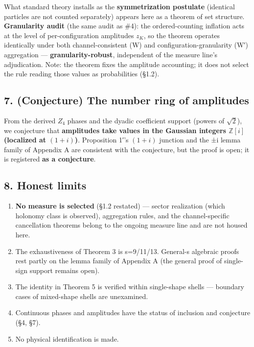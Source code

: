 \documentclass[
]{ltjsarticle}
\providecommand{\tightlist}{%
  \setlength{\itemsep}{0pt}\setlength{\parskip}{0pt}}
\begin{document}
What standard theory installs as the \textbf{symmetrization postulate}
(identical particles are not counted separately) appears here as a
theorem of set structure. \textbf{Granularity audit} (the same audit as
\#4): the ordered-counting inflation acts at the level of
per-configuration amplitudes \(z_K\), so the theorem operates
identically under both channel-consistent (W) and
configuration-granularity (W′) aggregation ---
\textbf{granularity-robust}, independent of the measure line's
adjudication. Note: the theorem fixes the amplitude accounting; it does
not select the rule reading those values as probabilities (§1.2).

\subsection{7. (Conjecture) The number ring of
amplitudes}\label{conjecture-the-number-ring-of-amplitudes}

From the derived \(Z_4\) phases and the dyadic coefficient support
(powers of \(\sqrt2\)), we conjecture that \textbf{amplitudes take
values in the Gaussian integers \(\mathbb{Z}[i]\) (localized at
\((1+i)\))}. Proposition 1′'s \((1+i)\) junction and the ±i lemma family
of Appendix A are consistent with the conjecture, but the proof is open;
it is registered \textbf{as a conjecture}.

\subsection{8. Honest limits}\label{honest-limits}

\begin{enumerate}
\def\labelenumi{\arabic{enumi}.}
\tightlist
\item
  \textbf{No measure is selected} (§1.2 restated) --- sector realization
  (which holonomy class is observed), aggregation rules, and the
  channel-specific cancellation theorems belong to the ongoing measure
  line and are not housed here.
\item
  The exhaustiveness of Theorem 3 is s=9/11/13. General-s algebraic
  proofs rest partly on the lemma family of Appendix A (the general
  proof of single-sign support remains open).
\item
  The identity in Theorem 5 is verified within single-shape shells ---
  boundary cases of mixed-shape shells are unexamined.
\item
  Continuous phases and amplitudes have the status of inclusion and
  conjecture (§4, §7).
\item
  No physical identification is made.
\end{enumerate}
\end{document}
